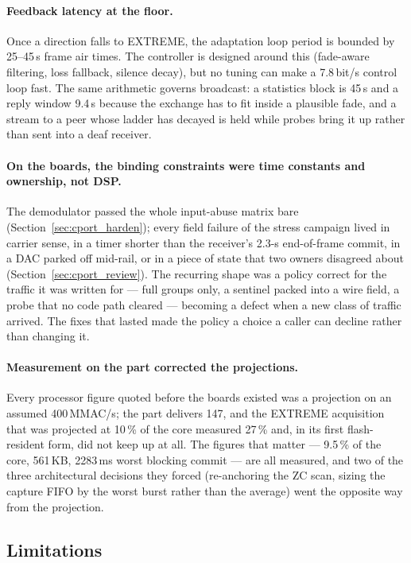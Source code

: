 \paragraph{Feedback latency at the floor.}  Once a direction falls to
EXTREME, the adaptation loop period is bounded by 25--45\,s frame air
times.  The controller is designed around this (fade-aware filtering,
loss fallback, silence decay), but no tuning can make a 7.8\,bit/s
control loop fast.  The same arithmetic governs broadcast: a
statistics block is 45\,s and a reply window 9.4\,s because the
exchange has to fit inside a plausible fade, and a stream to a peer
whose ladder has decayed is held while probes bring it up rather than
sent into a deaf receiver.

\paragraph{On the boards, the binding constraints were time constants
and ownership, not DSP.}  The demodulator passed the whole
input-abuse matrix bare (Section~\ref{sec:cport_harden}); every field
failure of the stress campaign lived in carrier sense, in a timer
shorter than the receiver's 2.3-s end-of-frame commit, in a DAC parked
off mid-rail, or in a piece of state that two owners disagreed about
(Section~\ref{sec:cport_review}).  The recurring shape was a policy
correct for the traffic it was written for --- full groups only, a
sentinel packed into a wire field, a probe that no code path cleared
--- becoming a defect when a new class of traffic arrived.  The fixes
that lasted made the policy a choice a caller can decline rather than
changing it.

\paragraph{Measurement on the part corrected the projections.}  Every
processor figure quoted before the boards existed was a projection on
an assumed 400\,MMAC/s; the part delivers 147, and the EXTREME
acquisition that was projected at 10\,\% of the core measured 27\,\%
and, in its first flash-resident form, did not keep up at all.  The
figures that matter --- 9.5\,\% of the core, 561\,KB, 2283\,ms worst
blocking commit --- are all measured, and two of the three
architectural decisions they forced (re-anchoring the ZC scan, sizing
the capture FIFO by the worst burst rather than the average) went the
opposite way from the projection.

\subsection{Limitations}

